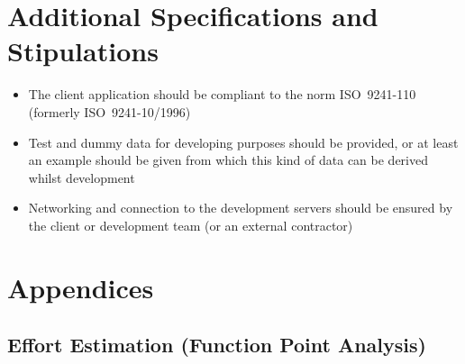 \documentclass[11pt,a4paper,oneside,svgnames]{report}
\begin{document}
\chapter{Additional Specifications and Stipulations}
\begin{itemize}
	\item The client application should be compliant to the norm ISO~9241-110 (formerly ISO~9241-10/1996)
	\item Test and dummy data for developing purposes should be provided, or at least an example should be given from which this kind of data can be derived whilst development
	\item Networking and connection to the development servers should be ensured by the client or development team (or an external contractor)
\end{itemize}

\chapter{Appendices}
\section{Effort Estimation (Function Point Analysis)}
\end{document}
